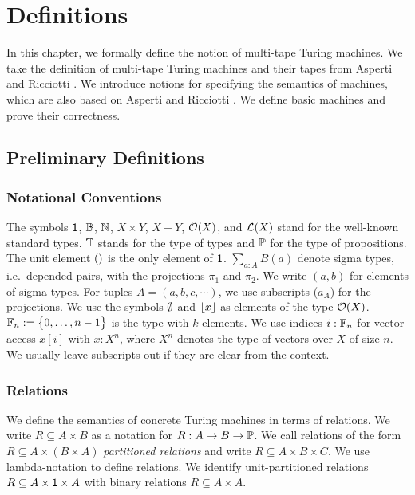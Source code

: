 \chapter{Definitions}
\label{chap:definitions}

In this chapter, we formally define the notion of multi-tape Turing machines.  We take the definition of multi-tape Turing machines and their tapes
from Asperti and Ricciotti \cite{asperti2015}.  We introduce notions for specifying the semantics of machines, which are also based on Asperti and
Ricciotti \cite{asperti2015}.  We define basic machines and prove their correctness.

\section{Preliminary Definitions}
\label{sec:prelim}


\subsection{Notational Conventions}
\label{sec:notational-conventions}

The symbols $\mathsf{1}$, $\mathbb{B}$, $\mathbb{N}$, $X \times Y$, $X + Y$, $\mathcal{O}(X)$, and $\mathcal{L}(X)$ stand for the well-known standard types.  $\mathbb{T}$ stands for
the type of types and $\mathbb{P}$ for the type of propositions.  The unit element $\mathsf{()}$ is the only element of $\mathsf{1}$.  $\sum_{a:A} B(a)$ denote sigma
types, i.e.\ depended pairs, with the projections $\pi_1$ and $\pi_2$.  We write $(a,b)$ for elements of sigma types.  For tuples
$A = (a, b, c, \cdots)$, we use subscripts ($a_A$) for the projections.  We use the symbols $\emptyset$ and $\left\lfloor {x} \right\rfloor$ as elements of the type
$\mathcal{O}(X)$.  $\mathbb{F}_n := \bigl\{ 0, \dots, n-1 \bigr \}$ is the type with $k$ elements.  We use indices $i:\mathbb{F}_n$ for vector-access $x[i]$ with $x:X^n$,
where $X^n$ denotes the type of vectors over $X$ of size $n$.  We usually leave subscripts out if they are clear from the context.


\subsection{Relations}
\label{sec:relations}

We define the semantics of concrete Turing machines in terms of relations.  We write $R \subseteq A \times B$ as a notation for
$R : A \rightarrow B \rightarrow \mathbb{P}$.  We call relations of the form $R \subseteq A \times (B \times A)$ \emph{partitioned relations} and write
$R \subseteq A \times B \times C$.  We use lambda-notation to define relations.  We identify unit-partitioned relations
$R \subseteq A \times \mathsf{1} \times A$ with binary relations $R \subseteq A \times A$.

